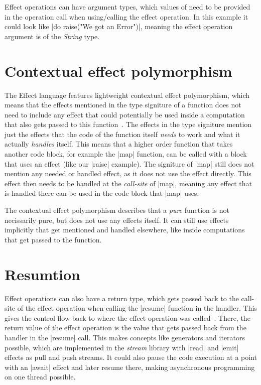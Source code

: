 Effect operations can have argument types, which values of need to be provided in the operation call when using/calling the effect operation. In this example it could look like |do raise("We got an Error")|, meaning the effect operation argument is of the \textit{String} type.

\section{Contextual effect polymorphism}

The Effect language features lightweight contextual effect polymorphism, which means that the effects mentioned in the type signiture of a function does not need to include any effect that could potentially be used inside a computation that also gets passed to this function~\cite{brachthauser2020effects}. The effects in the type signiture mention just the effects that the code of the function itself \textit{needs} to work and what it actually \textit{handles} itself. This means that a higher order function that takes another code block, for example the |map| function, can be called with a block that uses an effect (like our |raise| example). The signiture of |map| still does not mention any needed or handled effect, as it does not use the effect directly. This effect then needs to be handled at the \textit{call-site} of |map|, meaning any effect that is handled there can be used in the code block that |map| uses.

The contextual effect polymorphism describes that a \textit{pure} function is not necissarily pure, but does not use any effects itself. It can still use effects implicitly that get mentioned and handled elsewhere, like inside computations that get passed to the function.

\section{Resumtion}

Effect operations can also have a return type, which gets passed back to the call-site of the effect operation when calling the |resume| function in the handler. This gives the control flow back to where the effect operation was called~\cite{brachthauser2020effects}. There, the return value of the effect operation is the value that gets passed back from the handler in the |resume| call. This makes concepts like generators and iterators possible, which are implemented in the \textit{stream} library with |read| and |emit| effects as pull and push streams. It could also pause the code execution at a point with an |await| effect and later resume there, making asynchronous programming on one thread possible.

